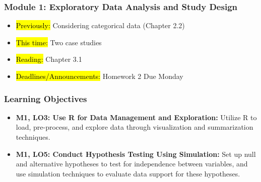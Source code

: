 
\begin{frame}
    \frametitle{Module 1: Exploratory Data Analysis and Study Design}
    \begin{itemize}
        \item \hl{Previously: }Considering categorical data (Chapter 2.2)
        \item \hl{This time: }Two case studies
        \item \hl{Reading: }Chapter 3.1
        \item \hl{Deadlines/Announcements: }Homework 2 Due Monday
    \end{itemize}

\end{frame}

\begin{frame}
    \frametitle{Learning Objectives}
    \begin{itemize}
        \item \textbf{M1, LO3: Use R for Data Management and Exploration:} Utilize R to load, pre-process, and explore data through visualization and summarization techniques.
        \item \textbf{M1, LO5: Conduct Hypothesis Testing Using Simulation:} Set up null and alternative hypotheses to test for independence between variables, and use simulation techniques to evaluate data support for these hypotheses.
    \end{itemize}
\end{frame}
